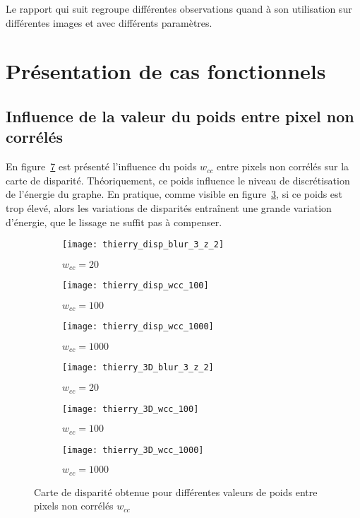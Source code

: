 \documentclass[12pt,a4paper,onecolumn]{article}
\begin{document}
Le rapport qui suit regroupe différentes observations quand à son utilisation sur différentes images et avec différents paramètres.

\section{Présentation de cas fonctionnels}

\subsection{Influence de la valeur du poids entre pixel non corrélés}

En figure~\ref{fig_thierry_wcc} est présenté l'influence du poids \(w_{cc}\) entre pixels non corrélés sur la carte de disparité. Théoriquement, ce poids influence le niveau de discrétisation de l'énergie du graphe. En pratique, comme visible en figure~\ref{fig_thierry_disp_wcc_1000}, si ce poids est trop élevé, alors les variations de disparités entraînent une grande variation d'énergie, que le lissage ne suffit pas à compenser.

\begin{figure}[H]
	\begin{subfigure}[b]{0.3\textwidth}
		\centering
		\texttt{[image: thierry\_disp\_blur\_3\_z\_2]}
		\caption{\(w_{cc} = 20\)}
		\label{fig_thierry_disp_wcc_20}
	\end{subfigure}
	\hfill
	\begin{subfigure}[b]{0.3\textwidth}
		\centering
		\texttt{[image: thierry\_disp\_wcc\_100]}
		\caption{\(w_{cc} = 100\)}
		\label{fig_thierry_disp_wcc_100}
	\end{subfigure}
	\hfill
	\begin{subfigure}[b]{0.3\textwidth}
		\centering
		\texttt{[image: thierry\_disp\_wcc\_1000]}
		\caption{\(w_{cc} = 1000\)}
		\label{fig_thierry_disp_wcc_1000}
	\end{subfigure}
	\hfill
	\begin{subfigure}[b]{0.3\textwidth}
		\centering
		\texttt{[image: thierry\_3D\_blur\_3\_z\_2]}
		\caption{\(w_{cc} = 20\)}
		\label{fig_thierry_3D_wcc_20}
	\end{subfigure}
	\hfill
	\begin{subfigure}[b]{0.3\textwidth}
		\centering
		\texttt{[image: thierry\_3D\_wcc\_100]}
		\caption{\(w_{cc} = 100\)}
		\label{fig_thierry_3D_wcc_100}
	\end{subfigure}
	\hfill
	\begin{subfigure}[b]{0.3\textwidth}
		\centering
		\texttt{[image: thierry\_3D\_wcc\_1000]}
		\caption{\(w_{cc} = 1000\)}
		\label{fig_thierry_3D_wcc_1000}
	\end{subfigure}
	\hfill
	\caption{Carte de disparité obtenue pour différentes valeurs de poids entre pixels non corrélés \(w_{cc}\)}
	\label{fig_thierry_wcc}
\end{figure}
\end{document}

